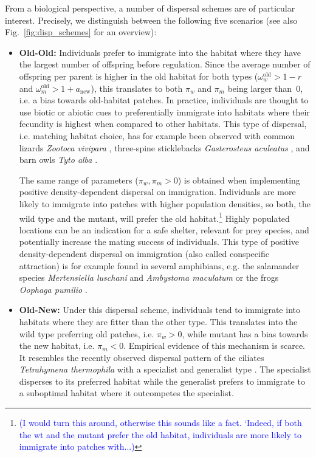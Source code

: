 \documentclass[a4paper,11pt]{article}
\newcommand{\francois}[1]{\textcolor{blue}{(#1)}}
\newcommand{\chg}[1]{\textcolor{change}{#1}}
\begin{document}
From a biological perspective, a number of dispersal schemes are of particular interest. Precisely, we distinguish between the following five scenarios (see also Fig.~\ref{fig:disp_schemes} for an overview):

\begin{itemize}
	\item \textbf{Old-Old:} Individuals prefer to immigrate into the habitat where they have the largest number of offspring before regulation. \chg{Since the average number of offspring per parent is higher in the old habitat for both types ($\omega^\text{old}_w>1-r$ and $\omega^\text{old}_m>1+a_{\text{new}}$), this translates} to both $\pi_w$ and $\pi_m$ being larger than~$0$, i.e. a bias towards old-habitat patches. In practice, individuals are thought to use biotic or abiotic cues to preferentially immigrate into habitats where their fecundity is highest when compared to other habitats. This type of dispersal, i.e. matching habitat choice, has for example been observed with common lizards \textit{Zootoca vivipara} \citep{bestion_2015}, three-spine sticklebacks \textit{Gasterosteus aculeatus} \citep{bolnick_2009}, and barn owls \textit{Tyto alba} \citep{dreiss_2011}. 
	
	The same range of parameters ($\pi_w,\pi_m>0$) is obtained when implementing positive density-dependent dispersal \chg{on immigration. I}ndividuals are more likely to immigrate into patches with higher population densities, so both, the wild type and the mutant, will prefer the old habitat.\footnote{\francois{I would turn this around, otherwise this sounds like a fact. `Indeed, if both the wt and the mutant prefer the old habitat, individuals are more likely to immigrate into patches with...}} Highly populated locations can be an indication for a safe shelter, relevant for prey species, and potentially increase the mating success of individuals. This type of positive density-dependent dispersal on immigration (also called conspecific attraction) is for example found in several amphibians, e.g. the salamander species \textit{Mertensiella luschani} \citep{gautier_2006} and \textit{Ambystoma maculatum} \citep{greene_2016} or the frogs \textit{Oophaga pumilio} \citep{folt_2018}.
	
	\item \textbf{Old-New:} Under this dispersal scheme, individuals tend to immigrate into habitats where they are fitter than the other type. This translates into the wild type preferring old patches, i.e. $\pi_w>0$, while mutant has a bias towards the new habitat, i.e. $\pi_m<0$. 
	Empirical evidence of this mechanism is scarce. It resembles the recently observed dispersal pattern of the ciliates \textit{Tetrahymena thermophila} with a specialist and generalist type \citep{jacob_2018}. The specialist disperses to its preferred habitat while the generalist prefers to immigrate to a suboptimal habitat where it outcompetes the specialist. 
	

\end{itemize}
\end{document}
